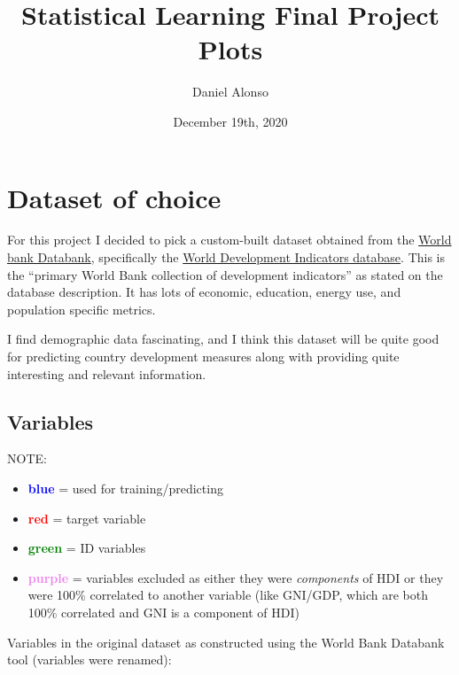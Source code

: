 \documentclass[]{article}
\title{Statistical Learning Final Project Plots}
\author{Daniel Alonso}
\date{December 19th, 2020}
\providecommand{\tightlist}{%
  \setlength{\itemsep}{0pt}\setlength{\parskip}{0pt}}
\begin{document}
\maketitle

{
\setcounter{tocdepth}{4}
\tableofcontents
}
\newpage

\hypertarget{dataset-of-choice}{%
\section{Dataset of choice}\label{dataset-of-choice}}

For this project I decided to pick a custom-built dataset obtained from
the \href{https://databank.worldbank.org/home.aspx}{World bank
Databank}, specifically the
\href{https://databank.worldbank.org/source/world-development-indicators}{World
Development Indicators database}. This is the ``primary World Bank
collection of development indicators'' as stated on the database
description. It has lots of economic, education, energy use, and
population specific metrics.

I find demographic data fascinating, and I think this dataset will be
quite good for predicting country development measures along with
providing quite interesting and relevant information.

\hypertarget{variables}{%
\subsection{Variables}\label{variables}}

\large

NOTE: \normalsize

\begin{itemize}
\tightlist
\item
  \textbf{\textcolor{blue}{blue}} = used for training/predicting
\item
  \textbf{\textcolor{red}{red}} = target variable
\item
  \textbf{\textcolor{green}{green}} = ID variables
\item
  \textbf{\textcolor{violet}{purple}} = variables excluded as either
  they were \emph{components} of HDI or they were 100\% correlated to
  another variable (like GNI/GDP, which are both 100\% correlated and
  GNI is a component of HDI)
\end{itemize}

Variables in the original dataset as constructed using the World Bank
Databank tool (variables were renamed):
\end{document}
